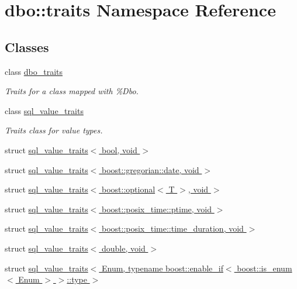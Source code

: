 \hypertarget{namespacedbo_1_1traits}{\section{dbo\+:\+:traits Namespace Reference}
\label{namespacedbo_1_1traits}
}
\subsection*{Classes}
\begin{DoxyCompactItemize}
\item 
class \hyperlink{structdbo_1_1traits_1_1dbo__traits}{dbo\+\_\+traits}
\begin{DoxyCompactList}\small\item\em Traits for a class mapped with \%Dbo. \end{DoxyCompactList}\item 
class \hyperlink{structdbo_1_1traits_1_1sql__value__traits}{sql\+\_\+value\+\_\+traits}
\begin{DoxyCompactList}\small\item\em Traits class for value types. \end{DoxyCompactList}\item 
struct \hyperlink{structdbo_1_1traits_1_1sql__value__traits_3_01bool_00_01void_01_4}{sql\+\_\+value\+\_\+traits$<$ bool, void $>$}
\item 
struct \hyperlink{structdbo_1_1traits_1_1sql__value__traits_3_01boost_1_1gregorian_1_1date_00_01void_01_4}{sql\+\_\+value\+\_\+traits$<$ boost\+::gregorian\+::date, void $>$}
\item 
struct \hyperlink{structdbo_1_1traits_1_1sql__value__traits_3_01boost_1_1optional_3_01_t_01_4_00_01void_01_4}{sql\+\_\+value\+\_\+traits$<$ boost\+::optional$<$ T $>$, void $>$}
\item 
struct \hyperlink{structdbo_1_1traits_1_1sql__value__traits_3_01boost_1_1posix__time_1_1ptime_00_01void_01_4}{sql\+\_\+value\+\_\+traits$<$ boost\+::posix\+\_\+time\+::ptime, void $>$}
\item 
struct \hyperlink{structdbo_1_1traits_1_1sql__value__traits_3_01boost_1_1posix__time_1_1time__duration_00_01void_01_4}{sql\+\_\+value\+\_\+traits$<$ boost\+::posix\+\_\+time\+::time\+\_\+duration, void $>$}
\item 
struct \hyperlink{structdbo_1_1traits_1_1sql__value__traits_3_01double_00_01void_01_4}{sql\+\_\+value\+\_\+traits$<$ double, void $>$}
\item 
struct \hyperlink{structdbo_1_1traits_1_1sql__value__traits_3_01_enum_00_01typename_01boost_1_1enable__if_3_01boosf3db7d431a3cc6684d99d55c76c69c74}{sql\+\_\+value\+\_\+traits$<$ Enum, typename boost\+::enable\+\_\+if$<$ boost\+::is\+\_\+enum$<$ Enum $>$ $>$\+::type $>$}

\end{DoxyCompactItemize}
